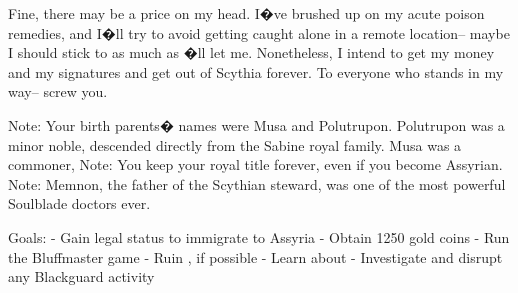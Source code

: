 \documentclass[char]{Kos}
\begin{document}
Fine, there may be a price on my head. I�ve brushed up on my acute poison remedies, and I�ll try to avoid getting caught alone in a remote location-- maybe I should stick to \cPoet{\nickname} as much as \cPoet{\they}�ll let me. Nonetheless, I intend to get my money and my signatures and get out of Scythia forever. To everyone who stands in my way-- screw you.


Note: Your birth parents� names were Musa and Polutrupon. Polutrupon was a minor noble, descended directly from the Sabine royal family. Musa was a commoner, 
Note: You keep your royal title forever, even if you become Assyrian.
Note: Memnon, the father of the Scythian steward, was one of the most powerful Soulblade doctors ever.

Goals:
- Gain legal status to immigrate to Assyria
- Obtain 1250 gold coins
- Run the Bluffmaster game
- Ruin \cBride{\nickname}, if possible
- Learn about \cAnarchist{\nickname}
- Investigate and disrupt any Blackguard activity
\end{document}
